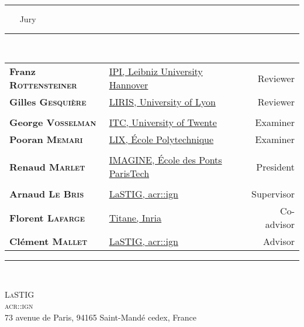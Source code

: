 \begin{titlepage}
\begin{center}
        \rule{.43\textwidth}{1pt} ~~~ {\Large Jury} ~~~ \rule{.43\textwidth}{1pt}\\
        \vspace*{1em}
        \begin{tabular}{l x{.5\textwidth} r}
            \textbf{Franz \textsc{Rottensteiner}} & \href{https://www.ipi.uni-hannover.de/en/rottensteiner/}{IPI, Leibniz University Hannover} & Reviewer \\
            \textbf{Gilles \textsc{Gesquière}} & \href{https://perso.liris.cnrs.fr/gilles.gesquiere/wiki/doku.php}{LIRIS, University of Lyon} & Reviewer \\
             & & \\
            \textbf{George \textsc{Vosselman}} & \href{https://research.utwente.nl/en/persons/george-vosselman}{ITC, University of Twente} & Examiner \\
            \textbf{Pooran \textsc{Memari}} & \href{http://www.lix.polytechnique.fr/~memari/}{LIX, \'Ecole Polytechnique} & Examiner \\
             & & \\
            \textbf{Renaud \textsc{Marlet}} & \href{http://imagine.enpc.fr/~marletr/}{IMAGINE, \'Ecole des Ponts ParisTech} & President \\
             & & \\
            \textbf{Arnaud \textsc{Le Bris}} & \href{http://recherche.ign.fr/labos/matis/~Le_Bris}{LaSTIG, \acrshort*{acr::ign}} & Supervisor \\
            \textbf{Florent \textsc{Lafarge}} & \href{https://www-sop.inria.fr/members/Florent.Lafarge/}{Titane, Inria} & Co-advisor \\
            \textbf{Clément \textsc{Mallet}} & \href{http://recherche.ign.fr/labos/matis/~mallet}{LaSTIG, \acrshort*{acr::ign}} & Advisor \\
        \end{tabular}
        \vspace*{1em}
        \rule{\textwidth}{1pt}\\

        \vfill

        \begin{minipage}{.75\textwidth}
            \centering
            \small
            \textsc{LaSTIG\\ \acrfull*{acr::ign}}\\
            73 avenue de Paris, 94165 Saint-Mandé cedex, France
        \end{minipage}
    \end{center}
\end{titlepage}

\emptypage

